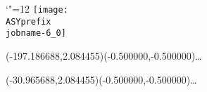 \setlength{\unitlength}{1pt}%
\makeatletter%
\let\ASYencoding\f@encoding%
\let\ASYfamily\f@family%
\let\ASYseries\f@series%
\let\ASYshape\f@shape%
\makeatother%
{\catcode`"=12%
\texttt{[image: \\ASYprefix\\jobname-6\_0]}%
}%
%
\fontsize{12.000000}{14.400000}\selectfont%
\usefont{\ASYencoding}{\ASYfamily}{\ASYseries}{\ASYshape}%
\ASYalign(-197.186688,2.084455)(-0.500000,-0.500000){\ldots}%
%
\fontsize{12.000000}{14.400000}\selectfont%
\ASYalign(-30.965688,2.084455)(-0.500000,-0.500000){\ldots}%
